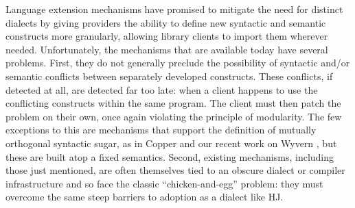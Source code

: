 \documentclass{sigplanconf}
\begin{document}
Language extension mechanisms have promised to mitigate the need for distinct dialects by giving providers the ability to define new syntactic and semantic constructs more granularly, allowing library clients to import them wherever needed. %
Unfortunately, the mechanisms that are available today have several problems. First, they do not generally preclude the possibility of  syntactic and/or semantic conflicts between separately developed constructs. These conflicts, if detected at all, are detected far too late: when a client happens to use the conflicting constructs within the same program. The client must then patch the problem on their own, once again violating the principle of modularity. The few exceptions to this are mechanisms that support the definition of mutually orthogonal  syntactic sugar, as in Copper \cite{conf/pldi/SchwerdfegerW09} and our recent work on Wyvern \cite{TSLs,sac15}, but these are built atop a fixed semantics. Second, existing mechanisms, including those just mentioned, are often themselves  tied to an obscure dialect or compiler infrastructure and so face the classic ``chicken-and-egg'' problem: they must overcome the same steep barriers to adoption as a dialect like HJ.  %
\end{document}
